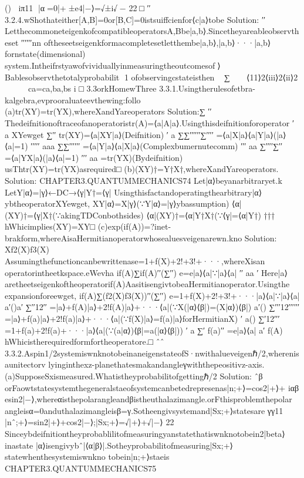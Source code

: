 {{()⟩
iπ11
|α⟩=0|+⟩±e4|−⟩=√±i√−
22□
′′
3.2.4.wShothateither[A,B]=0or[B,C]=0istsuiffcienfor⟨c|a⟩tobe
Solution:
′′
LetthecommoneteigenkofcompatibleoperatorsA,Bbe|a,b⟩.Sincetheyareableobservtheset
′′′′′′nn
oftheseetseigenkformacompletesetletthembe|a,b⟩,|a,b⟩···|a,b⟩fornstate(dimensional)
system.Intheifrstyawofvividuallyinmeasuringtheoutcomesof⟩Bablesobservthetotalyprobabilit
1
ofobservingcstateisthen
∑
⟨11⟩2⟨iii⟩2⟨ii⟩2

ca=ca,ba,bs
i
□
3.3orkHomewThree
3.3.1.Usingtherulesofetbra-kalgebra,evprooraluateevthewing:follo
(a)tr(XY)=tr(YX),whereXandYareoperators
Solution:∑
′′
Thedeifnitionoftraceofanoperatoristr(A)=⟨a|A|a⟩.Usingthisdeifnitionforoperator
′
a
XYewget
∑′′
tr(XY)=⟨a|XY|a⟩(Deifnition)
′
a
∑∑′′′′′′∑′′′′
=⟨a|X|a⟩⟨a|Y|a⟩(|a⟩⟨a|=1)
′′′′′
aaa
∑∑′′′′′′
=⟨a|Y|a⟩⟨a|X|a⟩(Complexbumernutecomm)
′′′
aa
∑′′′′∑′′
=⟨a|YX|a⟩(|a⟩⟨a|=1)
′′′
aa
=tr(YX)(Bydeifnition)
usThtr(XY)=tr(YX)asrequired□
(b)(XY)†=Y†X†,whereXandYareoperators.
Solution:
CHAPTER3.QUANTUMMECHANICS74
Let|α⟩beyanarbitraryet.k
LetY|α⟩=|γ⟩←DC→⟨γ|Y†=⟨γ|
Usingthisfactandoperatingthearbitrary|α⟩ybtheoperatorXYewget,
XY|α⟩=X|γ⟩(∵Y|α⟩=|γ⟩ybassumption)
⟨α|(XY)†=⟨γ|X†(∵akingTDConbothsides)
⟨α|(XY)†=⟨α|Y†X†(∵⟨γ|=⟨α|Y†)
†††
hWhicimplies(XY)=XY□
(c)exp(if(A))=?inet-brakform,whereAisaHermitianoperatorwhosealuesveigenarewn.kno
Solution:
Xf2(X)f3(X)
Assumingthefunctioncanbewrittenase=1+f(X)+2!+3!+···,whereXisan
operatorintheetkspace.eWevha
if(A)∑if(A)′′(∑′′)
e=e|a⟩⟨a|∵|a⟩⟨a|
′′
aa
′
Here|a⟩aretheetseigenkoftheoperatorif(A)AasitisengivtobeaHermitianoperator.Usingthe
expansionforeewget,
if(A)∑(f2(X)f3(X))′′(∑′′)
e=1+f(X)+2!+3!+···|a⟩⟨a|∵|a⟩⟨a|
a′()a′
∑′′12′′
=|a⟩+f(A)|a⟩+2!f(A)|a⟩+···⟨a|(∵X(|α⟩⟨β|)=(X|α⟩)⟨β|)
a′()
∑′′′12′′′′′′
=|a⟩+f(a)|a⟩+2!f(a)|a⟩+···⟨a|(∵f(X)|a⟩=f(a)|a⟩forHermitianX)
′
a()
∑′12′′′
=1+f(a)+2!f(a)+···|a⟩⟨a|(∵(a|α⟩)⟨β|=a(|α⟩⟨β|))
′
a
∑′
f(a)′′
=e|a⟩⟨a|
a′
f(A)
hWhicistherequiredformfortheoperatore.□
ˆˆ
3.3.2.Aspin1/2systemiswnknotobeinaneigenstateofS·nwithalueveigenℏ/2,wherenisaunitectorv
lyinginthexz-planethatesmakandangleγwiththepeositivz-axis.
(a)SupposeSxismeasured.Whatistheyprobabilitofgettingℏ/2
Solution:
ˆβ
orFaowtstatesystemthegeneralstaeofsystemcanbetedrepresenas|n;+⟩=cos2|+⟩+
iαβ
esin2|−⟩,whereαisthepolarangleandβistheuthalazimangle.orFthisproblemthepolar
angleisα=0anduthalazimangleisβ=γ.Sotheengivsystemand|Sx;+⟩statesare
γγ11
|nˆ;+⟩=sin2|+⟩+cos2|−⟩;|Sx;+⟩=√|+⟩+√|−⟩
22
Sinceybdeifnitiontheyprobablilitofmeasuringyanstatethatiswnknotobein2|beta⟩inastate
|α⟩isengivybˆ|⟨α|β⟩|.Sotheyprobabilitofmeasuring|Sx;+⟩statewhenthesystemiswnkno
tobein|n;+⟩staeis
CHAPTER3.QUANTUMMECHANICS75
}}
